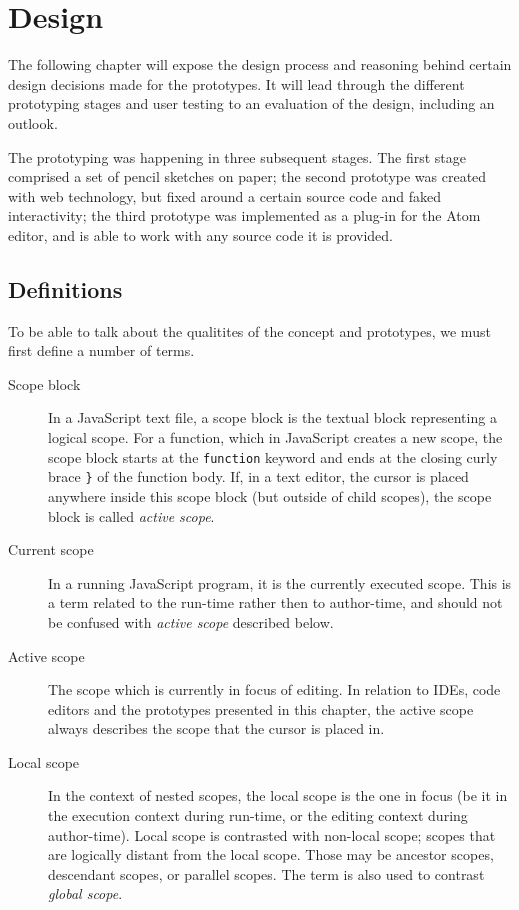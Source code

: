 \chapter{Design}\label{design}

The following chapter will expose the design process and reasoning
behind certain design decisions made for the prototypes. It will lead
through the different prototyping stages and user testing to an
evaluation of the design, including an outlook.

The prototyping was happening in three subsequent stages. The first
stage comprised a set of pencil sketches on paper; the second prototype
was created with web technology, but fixed around a certain source code
and faked interactivity; the third prototype was implemented as a
plug-in for the Atom editor, and is able to work with any source code it
is provided.

\section{Definitions}\label{definitions}

To be able to talk about the qualitites of the concept and prototypes,
we must first define a number of terms.

\begin{description}
\item[Scope block]
In a JavaScript text file, a scope block is the textual block
representing a logical scope. For a function, which in JavaScript
creates a new scope, the scope block starts at the \texttt{function}
keyword and ends at the closing curly brace \texttt{\}} of the function
body. If, in a text editor, the cursor is placed anywhere inside this
scope block (but outside of child scopes), the scope block is called
\emph{active scope}.
\item[Current scope]
In a running JavaScript program, it is the currently executed scope.
This is a term related to the run-time rather then to author-time, and
should not be confused with \emph{active scope} described below.
\item[Active scope]
The scope which is currently in focus of editing. In relation to IDEs,
code editors and the prototypes presented in this chapter, the active
scope always describes the scope that the cursor is placed in.
\item[Local scope]
In the context of nested scopes, the local scope is the one in focus (be
it in the execution context during run-time, or the editing context
during author-time). Local scope is contrasted with non-local scope;
scopes that are logically distant from the local scope. Those may be
ancestor scopes, descendant scopes, or parallel scopes. The term is also
used to contrast \emph{global scope}.
\end{description}

